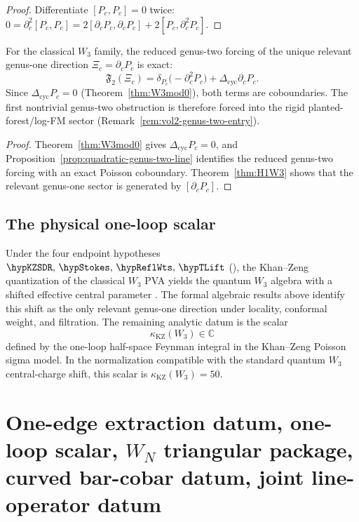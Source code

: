 \begin{proof}
Differentiate $[P_c,P_c]=0$ twice:
$0=\partial_c^2[P_c,P_c]=2[\partial_cP_c,\partial_cP_c]+2[P_c,\partial_c^2P_c]$.
\end{proof}

\begin{corollary}
\label{cor:w3-no-quadratic-self-obstruction}
For the classical $W_3$ family, the reduced genus-two forcing of the
unique relevant genus-one direction $\Xi_c=\partial_cP_c$ is exact:
\[
\mathfrak{F}_2(\Xi_c)
=
\delta_{P_c}\bigl(-\partial_c^2P_c\bigr)
+\Delta_{\mathrm{cyc}}\partial_cP_c.
\]
Since $\Delta_{\mathrm{cyc}}P_c=0$
\textup{(}Theorem~\textup{\ref{thm:W3mod0})}, both terms are
coboundaries. The first nontrivial genus-two obstruction is
therefore forced into the rigid planted-forest/log-FM sector
\textup{(}Remark~\textup{\ref{rem:vol2-genus-two-entry})}.
\end{corollary}

\begin{proof}
Theorem~\ref{thm:W3mod0} gives $\Delta_{\mathrm{cyc}}P_c=0$, and
Proposition~\ref{prop:quadratic-genus-two-line} identifies the reduced
genus-two forcing with an exact Poisson coboundary. Theorem~\ref{thm:H1W3}
shows that the relevant genus-one sector is generated by $[\partial_cP_c]$.
\end{proof}

\subsection{The physical one-loop scalar}

Under the four endpoint hypotheses
$\hypKZSDR,\,\hypStokes,\,\hypReflWts,\,\hypTLift$
\textup{(}\cite{KZ25,Costello2011Renorm,CG17,LurieHA}\textup{)},
the Khan--Zeng quantization of the classical $W_3$ PVA yields the quantum
$W_3$ algebra with a shifted effective central parameter \cite{KZ25}.
The formal algebraic results above identify this shift as the only
relevant genus-one direction under locality, conformal weight, and
filtration. The remaining analytic datum is the scalar
\[
\kappa_{\mathrm{KZ}}(W_3)\in\mathbb C
\]
defined by the one-loop half-space Feynman integral in the
Khan--Zeng Poisson sigma model. In the normalization compatible with
the standard quantum $W_3$ central-charge shift, this scalar is
\(\kappa_{\mathrm{KZ}}(W_3)=50\).

\section{One-edge extraction datum, one-loop scalar, $W_N$ triangular package, curved bar-cobar datum, joint line-operator datum}

